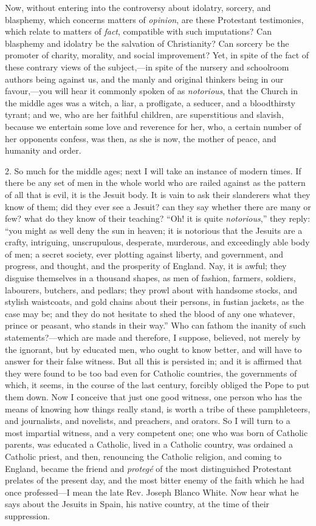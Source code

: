 Now, without entering into the controversy about
idolatry, sorcery, and blasphemy, which concerns matters
of \emph{opinion}, are these Protestant testimonies,
which relate to matters of \emph{fact}, compatible with
such imputations? Can blasphemy and idolatry be the
salvation of Christianity? Can sorcery be the promoter of
charity, morality, and social improvement? Yet, in spite
of the fact of these contrary views of the
subject,—in spite of the nursery and schoolroom
authors being against us, and the manly and original
thinkers being in our favour,—you will hear it
commonly spoken of as \emph{notorious}, that the Church
in the middle ages was a witch, a liar, a profligate, a
seducer, and a bloodthirsty tyrant; and we, who are her
faithful children, are superstitious and slavish, because we entertain some love and reverence for her, who, a
certain number of her opponents confess, was then, as she
is now, the mother of peace, and humanity and order.

2. So much for the middle ages; next I will take an
instance of modern times. If there be any set of men in
the whole world who are railed against as the pattern of
all that is evil, it is the Jesuit body. It is vain to
ask their slanderers what they know of them; did they
ever see a Jesuit? can they say whether there are many or
few? what do they know of their teaching? ``Oh! it is
quite \emph{notorious},'' they reply: ``you
might as well deny the sun in heaven; it is notorious
that the Jesuits are a crafty, intriguing, unscrupulous,
desperate, murderous, and exceedingly able body of men; a
secret society, ever plotting against liberty, and
government, and progress, and thought, and the prosperity
of England. Nay, it is awful; they disguise themselves in
a thousand shapes, as men of fashion, farmers, soldiers,
labourers, butchers, and pedlars; they prowl about with
handsome stocks, and stylish waistcoats, and gold chains
about their persons, in fustian jackets, as the case may
be; and they do not hesitate to shed the blood of any one
whatever, prince or peasant, who stands in their
way.'' Who can fathom the inanity of such
statements?—which are made and therefore, I suppose,
believed, not merely by the ignorant, but by educated
men, who ought to know better, and will have to answer
for their false witness. But all this is persisted in;
and it is affirmed that they were found to be too bad
even for Catholic countries, the governments of which, it
seems, in the course of the last century, forcibly
obliged the Pope to put them down. Now I conceive that
just one good witness, one person who has the means of
knowing how things really stand, is worth a tribe of
these pamphleteers, and journalists, and novelists, and
preachers, and orators. So I will turn to a most
impartial witness, and a very competent one; one who was
born of Catholic parents, was educated a Catholic, lived
in a Catholic country, was ordained a Catholic priest,
and then, renouncing the Catholic religion, and coming to
England, became the friend and \emph{protegé} of the
most distinguished Protestant prelates of the present
day, and the most bitter enemy of the faith which he had
once professed—I mean the late Rev. Joseph Blanco
White. Now hear what he says about the Jesuits in Spain,
his native country, at the time of their suppression.

